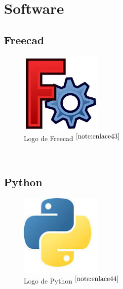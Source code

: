 \setcounter{footnote}{42} %

\section{Software}

\subsection{Freecad}

\begin{figure} [h!]
	\begin{center}
		\includegraphics[width=4cm]{figs/freecad.png}
	\end{center}
	\caption{Logo de Freecad $^{\ref{note:enlace43}}$} 
	\label{fig:freecad}
\end{figure}\

\setcounter{footnote}{43} %

\subsection{Python}

\begin{figure} [h!]
	\begin{center}
		\includegraphics[width=4cm]{figs/python.png}
	\end{center}
	\caption{Logo de Python $^{\ref{note:enlace44}}$} 
	\label{fig:python}
\end{figure}\

